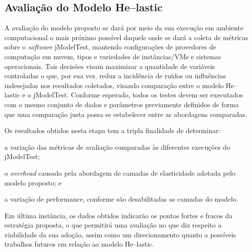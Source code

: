 \documentclass[english,brazilian]{UNISINOSmonografia} %
\begin{document}
\subsection{Avaliação do Modelo \textsf{He}--lastic}
\label{sec:metodologia-etapas-modelo}



A avaliação do modelo proposto se dará por meio da sua execução em ambiente computacional o mais próximo possível daquele onde se dará a coleta de métricas sobre o \textit{software} jModelTest, mantendo configurações de provedores de computação em nuvem, tipos e variedades de instâncias/VMs e sistemas operacionais.
Tais decisões visam maximizar a quantidade de variáveis controladas o que, por sua vez, reduz a incidência de ruídos ou influências indesejadas nos resultados coletados, visando comparação entre o modelo \textsf{He}--lastic e o jModelTest.
Conforme esperado, todos os testes devem ser executados com o mesmo conjunto de dados e parâmetros previamente definidos de forma que uma comparação justa possa se estabelecer entre as abordagens comparadas.



Os resultados obtidos nesta etapa tem a tripla finalidade de determinar:
\begin{inparaenum}[\itshape 1\upshape)] 
	\item a variação das métricas de avaliação comparadas às diferentes execuções do jModelTest;  
	\item o \textit{overhead} causado pela abordagem de camadas de elasticidade adotada pelo modelo proposto; e
	\item a variação de performance, conforme são desabilitadas as camadas do modelo.
\end{inparaenum}
Em última instância, os dados obtidos indicarão os pontos fortes e fracos da estratégia proposta, o que permitirá uma avaliação no que diz respeito a viabilidade da sua adoção, assim como um direcionamento quanto a possíveis trabalhos futuros em relação ao modelo \textsf{He}--lastic.
\end{document}
